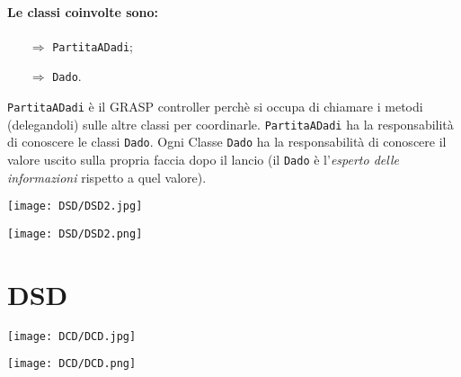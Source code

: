 \paragraph{Le classi coinvolte sono:}

\begin{itemize}
  \item [$\Rightarrow$] \texttt{PartitaADadi};
  \item [$\Rightarrow$] \texttt{Dado}.
\end{itemize}

\texttt{PartitaADadi} è il GRASP controller perchè si occupa di chiamare i metodi (delegandoli) sulle altre classi per coordinarle. \texttt{PartitaADadi} ha la responsabilità di conoscere le classi \texttt{Dado}. Ogni Classe \texttt{Dado} ha la responsabilità di conoscere il valore uscito sulla propria faccia dopo il lancio (il \texttt{Dado} è l'\textit{esperto delle informazioni} rispetto a quel valore).

\begin{center}
  \texttt{[image: DSD/DSD2.jpg]}
\end{center}


\begin{center}
  \texttt{[image: DSD/DSD2.png]}
\end{center}

\section{DSD}


\begin{center}
  \texttt{[image: DCD/DCD.jpg]}
\end{center}


\begin{center}
  \texttt{[image: DCD/DCD.png]}
\end{center}
